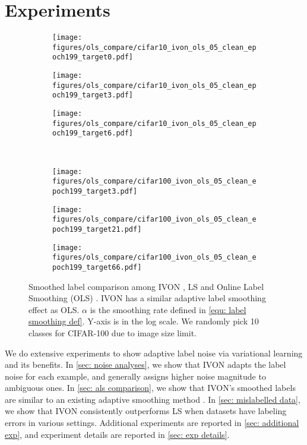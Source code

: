 \section{Experiments}

\begin{figure*}[t!]
	\centering
	\begin{subfigure}{0.33\linewidth}
		\centering
		\texttt{[image: figures/ols\_compare/cifar10\_ivon\_ols\_05\_clean\_epoch199\_target0.pdf]}
	\end{subfigure}
	\begin{subfigure}{0.33\linewidth}
		\centering
		\texttt{[image: figures/ols\_compare/cifar10\_ivon\_ols\_05\_clean\_epoch199\_target3.pdf]}
	\end{subfigure}
	\begin{subfigure}{0.33\linewidth}
		\centering
		\texttt{[image: figures/ols\_compare/cifar10\_ivon\_ols\_05\_clean\_epoch199\_target6.pdf]}
	\end{subfigure} \\
	\vspace{0.3cm}
	\begin{subfigure}{0.33\linewidth}
		\centering
		\texttt{[image: figures/ols\_compare/cifar100\_ivon\_ols\_05\_clean\_epoch199\_target3.pdf]}
	\end{subfigure}
	\begin{subfigure}{0.33\linewidth}
		\centering
		\texttt{[image: figures/ols\_compare/cifar100\_ivon\_ols\_05\_clean\_epoch199\_target21.pdf]}
	\end{subfigure}
	\begin{subfigure}{0.33\linewidth}
		\centering
		\texttt{[image: figures/ols\_compare/cifar100\_ivon\_ols\_05\_clean\_epoch199\_target66.pdf]}
	\end{subfigure}
	\caption{Smoothed label comparison among IVON \citep{IVON}, LS \citep{Szegedy_rethinking} and Online Label Smoothing (OLS) \citep{zhang2021delving}. IVON has a similar adaptive label smoothing effect as OLS. $\alpha$ is the smoothing rate defined in \cref{equ: label smoothing def}. Y-axis is in the log scale. We randomly pick 10 classes for CIFAR-100 due to image size limit.}
	\label{fig: ols_comparison}
\end{figure*}

We do extensive experiments to show adaptive label noise via variational learning and its benefits. In \cref{sec: noise analyses}, we show that IVON adapts the label noise for each example, and generally assigns higher noise magnitude to ambiguous ones. In \cref{sec: als comparison}, we show that IVON's smoothed labels are similar to an existing adaptive smoothing method \citep{zhang2021delving}. In \cref{sec: mislabelled data}, we show that IVON consistently outperforms LS when datasets have labeling errors in various settings. Additional experiments are reported in \cref{sec: additional exp}, and experiment details are reported in \cref{sec: exp details}.


